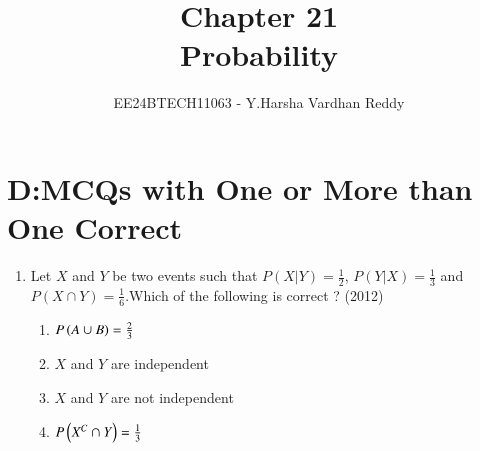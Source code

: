 \documentclass[journal,,12pt,onecolumn]{IEEEtran}
\theoremstyle{remark}
\begin{document}

\vspace{3cm}

\title{Chapter 21\\Probability}
\author{EE24BTECH11063 - Y.Harsha Vardhan Reddy}
\maketitle

\bigskip

\renewcommand{\thefigure}{\theenumi}
\renewcommand{\thetable}{\theenumi}

\section*{D:MCQs with One or More than One Correct}
\begin{enumerate}
    \item Let $X$ and $Y$ be two events such that $P(X|Y)=\frac{1}{2}$, $P(Y|X)=\frac{1}{3}$ and $P(X\cap Y)=\frac{1}{6}$.Which of the following is  correct ?
    \hfill{(2012)}
    \begin{enumerate}
    
        
    
        \item $P\left(A\cup B\right)=\frac{2}{3}$
        \item $X$ and $Y$ are independent 
        \item $X$ and $Y$ are not independent
        \item $P\left(X^C \cap Y\right)=\frac{1}{3}$ 
        

\end{enumerate}
\end{enumerate}
\end{document}
